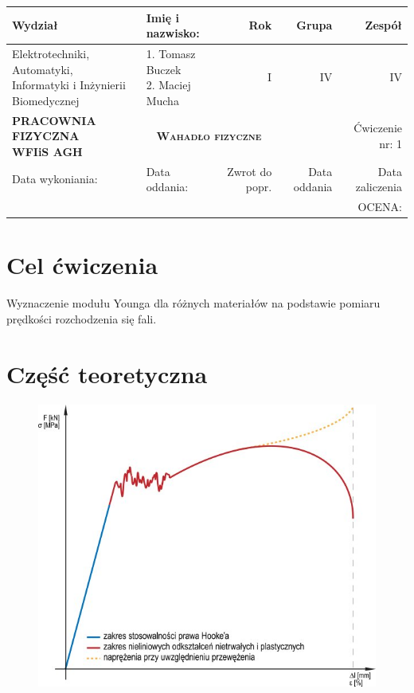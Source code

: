\documentclass{article}
\begin{document}
\begin{center}
   \setlength{\extrarowheight}{5pt}
    \begin{tabular}{|l|l|r|r|r|}
      \hline
      \textbf{Wydział} & \textbf{Imię i nazwisko:} & \textbf{Rok} & \textbf{Grupa} & \textbf{Zespół}\\ [10pt] \hline
      \makecell{Elektrotechniki, Automatyki,\\ Informatyki i Inżynierii Biomedycznej} & \makecell{1. Tomasz Buczek \\ 2. Maciej Mucha} & I & IV & IV \\ [10pt] \hline
      \makecell{\textbf{PRACOWNIA} \\ \textbf{FIZYCZNA} \\ \textbf{WFIiS AGH}} & \multicolumn{2}{c}{\textbf{\textsc{Wahadło fizyczne}}} &  & Ćwiczenie nr: 1 \\ [10pt]
      \hline
      Data wykoniania: & Data oddania: & Zwrot do popr. & Data oddania & Data zaliczenia \\ [25pt] \hline
      \multicolumn{5}{r}{OCENA: \hspace {2cm} }
    \end{tabular}
\end{center}

\section{Cel ćwiczenia}
Wyznaczenie modułu Younga dla różnych materiałów na podstawie pomiaru prędkości rozchodzenia się fali.

\section{Część teoretyczna}

\begin{figure} 
     \includegraphics[scale=0.5]{wykres.jpg}
     \label{fig:my_label}
 \end{figure}
 
\end{document}
